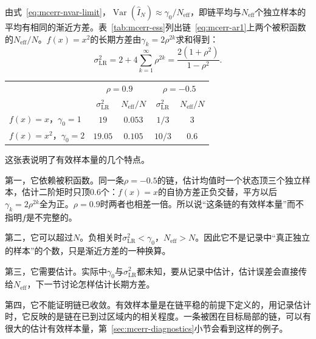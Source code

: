 由式~\eqref{eq:mcerr-nvar-limit}，$\operatorname{Var}(\hat{I}_N)\approx\gamma_0/N_{\mathrm{eff}}$，即链平均与$N_{\mathrm{eff}}$个独立样本的平均有相同的渐近方差。表~\ref{tab:mcerr-ess}列出链~\eqref{eq:mcerr-ar1}上两个被积函数的$N_{\mathrm{eff}}/N$。$f(x)=x^{2}$的长期方差由$\gamma_k=2\rho^{2k}$求和得到：
\[
 \sigma_{\mathrm{LR}}^{2}=2+4\sum_{k=1}^{\infty}\rho^{2k}=\frac{2(1+\rho^{2})}{1-\rho^{2}} .
\]

\begin{BookInlineTable}
 \centering
 \caption{链~\eqref{eq:mcerr-ar1}上两个被积函数的长期方差与有效样本量}
 \label{tab:mcerr-ess}
 \begin{tabular}{lcccc}
  \toprule
  & \multicolumn{2}{c}{$\rho=0.9$} & \multicolumn{2}{c}{$\rho=-0.5$} \\
  & $\sigma_{\mathrm{LR}}^{2}$ & $N_{\mathrm{eff}}/N$ & $\sigma_{\mathrm{LR}}^{2}$ & $N_{\mathrm{eff}}/N$ \\
  \midrule
  $f(x)=x$，$\gamma_0=1$ & $19$ & $0.053$ & $1/3$ & $3$ \\
  $f(x)=x^{2}$，$\gamma_0=2$ & $19.05$ & $0.105$ & $10/3$ & $0.6$ \\
  \bottomrule
 \end{tabular}
\end{BookInlineTable}

这张表说明了有效样本量的几个特点。

第一，它依赖被积函数。同一条$\rho=-0.5$的链，估计均值时一个状态顶三个独立样本，估计二阶矩时只顶$0.6$个：$f(x)=x$的自协方差正负交替，平方以后$\gamma_k=2\rho^{2k}$全为正。$\rho=0.9$时两者也相差一倍。所以说“这条链的有效样本量”而不指明$f$是不完整的。

第二，它可以超过$N$。负相关时$\sigma_{\mathrm{LR}}^{2}<\gamma_0$，$N_{\mathrm{eff}}>N$。因此它不是记录中“真正独立的样本”的个数，只是渐近方差的一种换算。

第三，它需要估计。实际中$\gamma_0$与$\sigma_{\mathrm{LR}}^{2}$都未知，要从记录中估计，估计误差会直接传给$N_{\mathrm{eff}}$，下一节讨论怎样估计长期方差。

第四，它不能证明链已收敛。有效样本量是在链平稳的前提下定义的，用记录估计时，它反映的是链在已到过区域内的相关程度。一条被困在目标局部的链，可以有很大的估计有效样本量，第~\ref{sec:mcerr-diagnostics}小节会看到这样的例子。
